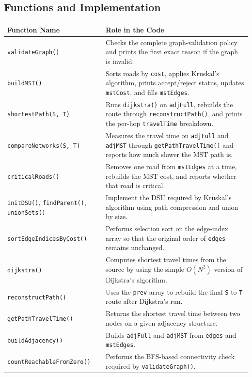 \documentclass[10pt,a4paper]{article}
\begin{document}
\subsection{Functions and Implementation}
\begin{table}[H]
\centering
\scriptsize
\begin{tabularx}{\textwidth}{|p{4.35cm}|X|}
\hline
\textbf{Function Name} & \textbf{Role in the Code} \\
\hline
\texttt{validateGraph()} & Checks the complete graph-validation policy and prints the first exact reason if the graph is invalid. \\
\hline
\texttt{buildMST()} & Sorts roads by \texttt{cost}, applies Kruskal's algorithm, prints accept/reject status, updates \texttt{mstCost}, and fills \texttt{mstEdges}. \\
\hline
\texttt{shortestPath(S, T)} & Runs \texttt{dijkstra()} on \texttt{adjFull}, rebuilds the route through \texttt{reconstructPath()}, and prints the per-hop \texttt{travelTime} breakdown. \\
\hline
\texttt{compareNetworks(S, T)} & Measures the travel time on \texttt{adjFull} and \texttt{adjMST} through \texttt{getPathTravelTime()} and reports how much slower the MST path is. \\
\hline
\texttt{criticalRoads()} & Removes one road from \texttt{mstEdges} at a time, rebuilds the MST cost, and reports whether that road is critical. \\
\hline
\texttt{initDSU()}, \texttt{findParent()}, \texttt{unionSets()} & Implement the DSU required by Kruskal's algorithm using path compression and union by size. \\
\hline
\texttt{sortEdgeIndicesByCost()} & Performs selection sort on the edge-index array so that the original order of \texttt{edges} remains unchanged. \\
\hline
\texttt{dijkstra()} & Computes shortest travel times from the source by using the simple \(O(N^2)\) version of Dijkstra's algorithm. \\
\hline
\texttt{reconstructPath()} & Uses the \texttt{prev} array to rebuild the final \texttt{S} to \texttt{T} route after Dijkstra's run. \\
\hline
\texttt{getPathTravelTime()} & Returns the shortest travel time between two nodes on a given adjacency structure. \\
\hline
\texttt{buildAdjacency()} & Builds \texttt{adjFull} and \texttt{adjMST} from \texttt{edges} and \texttt{mstEdges}. \\
\hline
\texttt{countReachableFromZero()} & Performs the BFS-based connectivity check required by \texttt{validateGraph()}. \\
\hline
\end{tabularx}
\end{table}
\end{document}
